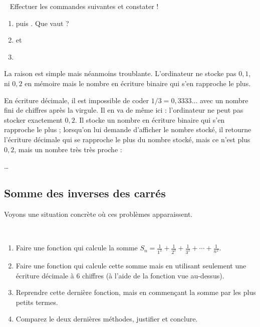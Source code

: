 \documentclass[class=report,crop=false]{standalone}
\begin{document}
\begin{tp}~
Effectuer les commandes suivantes et constater !
\begin{enumerate}
  \item {} puis . Que vaut  ?
  \item {} \quad et \quad  {}
  \item {}
\end{enumerate}
\end{tp}

La raison est simple mais néanmoins troublante.
L'ordinateur ne stocke pas $0,1$, ni $0,2$ en mémoire mais le nombre en écriture binaire
qui s'en rapproche le plus.

En écriture décimale, il est impossible de coder $1/3 = 0,3333\ldots$ avec un nombre fini
de chiffres après la virgule. Il en va de même ici : l'ordinateur ne peut pas stocker exactement $0,2$.
Il stocke un nombre en écriture binaire qui s'en rapproche le plus ; lorsqu'on lui demande d'afficher
le nombre stocké, il retourne l'écriture décimale qui se rapproche le plus du nombre stocké, mais ce n'est plus
$0,2$, mais un nombre très très proche :

 \centerline{\ldots}



\subsection{Somme des inverses des carrés}

Voyons une situation concrète où ces problèmes apparaissent.

\begin{tp}~
\begin{enumerate}
  \item Faire une fonction qui calcule la somme $S_n = \frac{1}{1^2} + \frac{1}{2^2}+\frac{1}{3^2}+\cdots + \frac{1}{n^2}$.

  \item Faire une fonction qui calcule cette somme mais en utilisant seulement une écriture décimale à $6$ chiffres
  (à l'aide de la fonction  vue au-dessus).

  \item Reprendre cette dernière fonction, mais en commençant la somme par les plus petits termes.

  \item Comparez le deux dernières méthodes, justifier et conclure.
\end{enumerate}
\end{tp}
\end{document}
